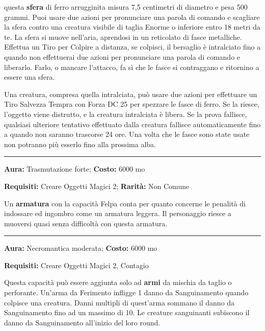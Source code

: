 \begin{multicols}{2}
questa \textbf{sfera} di ferro arrugginita misura 7,5 centimetri di diametro e pesa 500 grammi. Puoi usare due azioni per pronunciare una parola di comando e scagliare la sfera contro una creatura visibile di taglia Enorme o inferiore entro 18 metri da te. La sfera si muove nell'aria, aprendosi in un reticolato di fasce metalliche. Effettua un Tiro per Colpire a distanza, se colpisci, il bersaglio è intralciato fino a quando non effettuerai due azioni per pronunciare una parola di comando e liberarlo. Farlo, o mancare l'attacco, fa sì che le fasce si contraggano e ritornino a essere una sfera.

Una creatura, compresa quella intralciata, può usare due azioni per effettuare un Tiro Salvezza Tempra con Forza DC 25 per spezzare le fasce di ferro. Se la riesce, l'oggetto viene distrutto, e la creatura intralciata è libera. Se la prova fallisce, qualsiasi ulteriore tentativo effettuato dalla creatura fallisce automaticamente fino a quando non saranno trascorse 24 ore. Una volta che le fasce sono state usate non potranno più esserlo fino alla prossima alba.

\smallskip\noindent\rule{\linewidth}{2pt}  \hypertarget{Felpa}{}\smallskip{}\noindent\label{Felpa}

\textbf{Aura:} Trasmutazione forte; \textbf{Costo:} 6000 mo

\textbf{Requisiti:} Creare Oggetti Magici 2; \textbf{Rarità:} Non Comune

Un \textbf{armatura} con la capacità Felpa conta per quanto concerne le penalità di indossare ed ingombro come un armatura leggera. Il personaggio riesce a muoversi quasi senza difficoltà con questa armatura.

\smallskip\noindent\rule{\linewidth}{2pt}  \hypertarget{Ferimento}{}\smallskip{}\noindent\label{Ferimento}

\textbf{Aura:} Necromantica moderata; \textbf{Costo:} 6000 mo

\textbf{Requisiti:} Creare Oggetti Magici 2, Contagio

Questa capacità può essere aggiunta solo ad \textbf{armi} da mischia da taglio o perforante. Un'arma da Ferimento infligge 1 danno da Sanguinamento quando colpisce una creatura. Danni multipli di quest'arma sommano il danno da Sanguinamento fino ad un massimo di 10.
Le creature sanguinanti subiscono il danno da Sanguinamento all'inizio del loro round.


\end{multicols}
